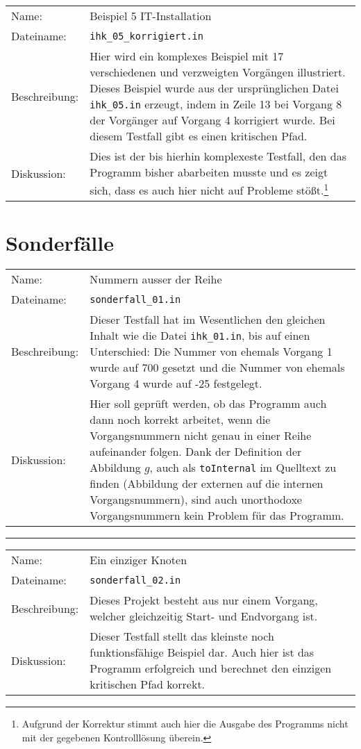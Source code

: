 \begin{tabularx}{\textwidth}{l X}
  Name: & Beispiel 5 IT-Installation \\
  Dateiname: & \texttt{ihk\_05\_korrigiert.in} \\
  Beschreibung: & Hier wird ein komplexes Beispiel mit 17
  verschiedenen und verzweigten Vorg\"angen illustriert. Dieses
  Beispiel wurde aus der urspr\"unglichen Datei \texttt{ihk\_05.in}
  erzeugt, indem in Zeile 13 bei Vorgang 8 der Vorg\"anger auf Vorgang 4
  korrigiert wurde. Bei diesem Testfall gibt es einen kritischen Pfad.\\
  Diskussion: & Dies ist der bis hierhin komplexeste Testfall, den das
  Programm bisher abarbeiten musste und es zeigt sich, dass es auch
  hier nicht auf Probleme st\"o{\ss}t.\footnote{Aufgrund der Korrektur
  stimmt auch hier die Ausgabe des Programms nicht mit der gegebenen
  Kontrolll\"osung \"uberein.}\\
\end{tabularx}

\section{Sonderf\"alle}
\begin{tabularx}{\textwidth}{l X}
  Name: & Nummern ausser der Reihe \\
  Dateiname: & \texttt{sonderfall\_01.in} \\
  Beschreibung: & Dieser Testfall hat im Wesentlichen den gleichen
  Inhalt wie die Datei \texttt{ihk\_01.in}, bis auf einen Unterschied:
  Die Nummer von ehemals Vorgang 1 wurde auf 700 gesetzt und die
  Nummer von ehemals Vorgang 4 wurde auf -25 festgelegt.\\
  Diskussion: & Hier soll gepr\"uft werden, ob das Programm auch dann
  noch korrekt arbeitet, wenn die Vorgangsnummern nicht genau in einer
  Reihe aufeinander folgen. Dank der Definition der Abbildung \(g\),
  auch als \texttt{toInternal} im Quelltext zu finden
  (Abbildung der externen auf die internen Vorgangsnummern), sind auch
  unorthodoxe Vorgangsnummern kein Problem f\"ur das Programm.\\
\end{tabularx}
\hrule
\begin{tabularx}{\textwidth}{l X}
  Name: & Ein einziger Knoten \\
  Dateiname: & \texttt{sonderfall\_02.in} \\
  Beschreibung: & Dieses Projekt besteht aus nur einem Vorgang,
  welcher gleichzeitig Start- und Endvorgang ist.\\
  Diskussion: & Dieser Testfall stellt das kleinste noch
  funktionsf\"ahige Beispiel dar. Auch hier ist das Programm
  erfolgreich und berechnet den einzigen kritischen Pfad korrekt.\\
\end{tabularx}

